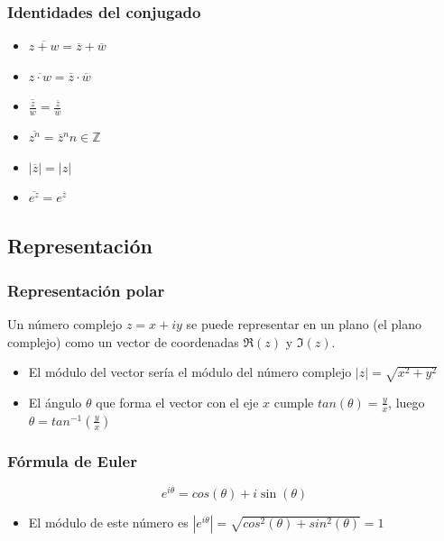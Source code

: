 \documentclass[paper=a4, fontsize=11pt]{scrartcl}
\numberwithin{equation}{section}
\numberwithin{figure}{section}
\numberwithin{table}{section}
\begin{document}
\subsubsection{Identidades del conjugado}\mbox{}
\begin{itemize}
\item $\overline{z+w} = \overline{z}+\overline{w}$
\item $\overline{z\cdot w} = \overline{z}\cdot \overline{w}$
\item $\overline{\frac{z}{w}} = \frac{\overline{z}}{\overline{w}}$
\item $\overline{z^n}=\overline{z}^n$\hspace{5mm}$n\in\mathbb{Z}$
\item $|\overline{z}| = |z|$
\item $\overline{e^z} = e^{\overline{z}}$
\end{itemize}

\subsection{Representación}

\subsubsection{Representación polar}\mbox{}

Un número complejo $z=x+iy$ se puede representar en un plano (el plano complejo) como un vector de coordenadas $\Re(z)$ y $\Im(z)$.

\begin{itemize}
\item El módulo del vector sería el módulo del número complejo $\boxed{|z|=\sqrt{x^2+y^2}}$
\item El ángulo $\theta$ que forma el vector con el eje $x$ cumple $tan(\theta) = \frac{y}{x}$, luego $\boxed{\theta = tan^{-1}\left(\frac{y}{x}\right)}$
\end{itemize}

\subsubsection{Fórmula de Euler}\mbox{}

$$\boxed{e^{i\theta}=cos(\theta)+i\sin(\theta)}$$
\begin{itemize}
\item El módulo de este número es $|e^{i\theta}|=\sqrt{cos^2(\theta)+sin^2(\theta)} = 1$
\end{itemize}
\end{document}
